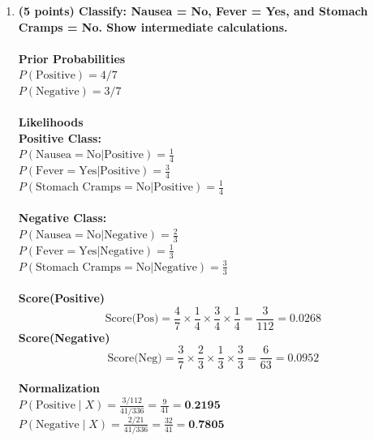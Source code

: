 \documentclass[12pt]{article}
\begin{document}
\begin{enumerate}[label=(\alph*)]
    \item \textbf{(5 points) Classify: Nausea = No, Fever = Yes, and Stomach Cramps = No. Show intermediate calculations.}
    \\ \\
    \textbf{Prior Probabilities} \\
    $P(\text{Positive}) = 4/7$ \\
    $P(\text{Negative}) = 3/7$ \\ \\

    \textbf{Likelihoods} \\
    \textbf{Positive Class:} \\
    $P(\text{Nausea} = \text{No}|\text{Positive}) = \frac{1}{4}$ \\
    $P(\text{Fever} = \text{Yes}|\text{Positive}) = \frac{3}{4}$ \\
    $P(\text{Stomach Cramps} = \text{No}|\text{Positive}) = \frac{1}{4}$ \\ \\
    \textbf{Negative Class:} \\
    $P(\text{Nausea} = \text{No}|\text{Negative}) = \frac{2}{3}$ \\
    $P(\text{Fever} = \text{Yes}|\text{Negative}) = \frac{1}{3}$ \\
    $P(\text{Stomach Cramps} = \text{No}|\text{Negative}) = \frac{3}{3}$ \\ \\

    \textbf{Score(Positive)} \\
    $$\text{Score(Pos)} = \frac{4}{7} \times \frac{1}{4} \times \frac{3}{4} \times \frac{1}{4} = \frac{3}{112} = 0.0268$$
    \textbf{Score(Negative)} \\
    $$\text{Score(Neg)} = \frac{3}{7} \times \frac{2}{3} \times \frac{1}{3} \times \frac{3}{3} = \frac{6}{63} = 0.0952$$

    \textbf{Normalization} \\
    $P(\text{Positive} \mid X) = \frac{3/112}{41/336} = \frac{9}{41} = \textbf{0.2195}$\\
    $P(\text{Negative} \mid X) = \frac{2/21}{41/336} = \frac{32}{41} = \textbf{0.7805}$


\end{enumerate}

\newpage
\end{document}
